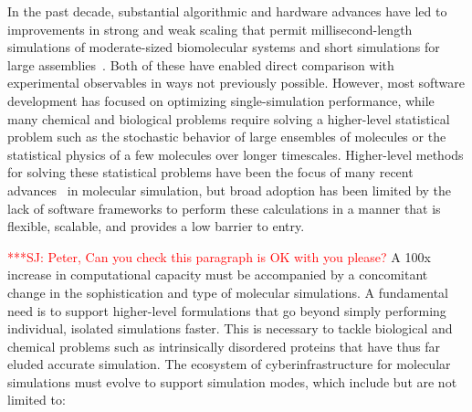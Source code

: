 \documentclass[10pt,letterpaper,draft]{article}
\newcommand{\jhanote}[1]{ \textcolor{red}  {***SJ:#1}\xspace}
\newcommand{\jhanote}[1]{}
\begin{document}
{\noindent In} the past decade, substantial algorithmic and hardware advances have led to
improvements in strong and weak scaling that permit millisecond-length
simulations of moderate-sized biomolecular systems and short simulations for
large assemblies~\cite{kasson2}.  Both of these have enabled direct comparison with
experimental observables in ways not previously possible.  However, most
software development has focused on optimizing single-simulation performance,
while many chemical and biological problems require solving a higher-level
statistical problem such as the stochastic behavior of large ensembles of
molecules or the statistical physics of a few molecules over longer timescales.
Higher-level methods for solving these statistical problems have been the focus
of many recent advances~\cite{kasson1} in molecular simulation, but broad adoption has been
limited by the lack of software frameworks to perform these calculations in a
manner that is flexible, scalable, and provides a low barrier to entry.


\jhanote{ Peter, Can you check this paragraph is OK with you please?}
A 100x increase in computational capacity must be accompanied by a concomitant
change in the sophistication and type of molecular simulations. A fundamental
need is to support higher-level formulations that go beyond simply performing
individual, isolated simulations faster.
This is necessary to tackle biological and chemical problems such as
intrinsically disordered proteins that have thus far eluded accurate simulation.
The ecosystem of cyberinfrastructure for molecular simulations must evolve to
support simulation modes, which include but are not limited to:
\end{document}
